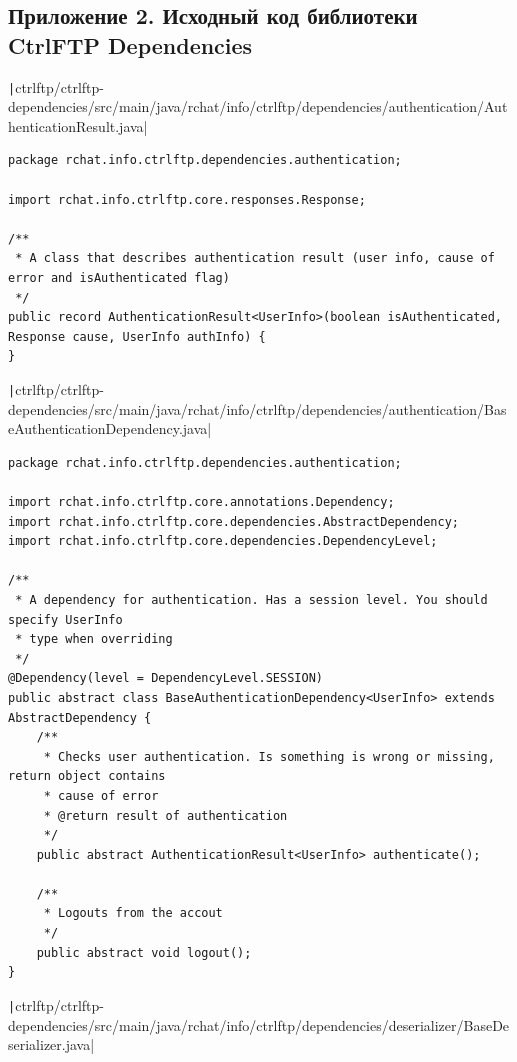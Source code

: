 \documentclass[a4paper,14pt]{extarticle}
\begin{document}
\subsection{Приложение 2. Исходный код библиотеки CtrlFTP Dependencies}
\texttt|ctrlftp/ctrlftp-dependencies/src/main/java/rchat/info/ctrlftp/dependencies/authentication/AuthenticationResult.java|
\begin{verbatim}
package rchat.info.ctrlftp.dependencies.authentication;

import rchat.info.ctrlftp.core.responses.Response;

/**
 * A class that describes authentication result (user info, cause of error and isAuthenticated flag)
 */
public record AuthenticationResult<UserInfo>(boolean isAuthenticated, Response cause, UserInfo authInfo) {
}
\end{verbatim}
\texttt|ctrlftp/ctrlftp-dependencies/src/main/java/rchat/info/ctrlftp/dependencies/authentication/BaseAuthenticationDependency.java|
\begin{verbatim}
package rchat.info.ctrlftp.dependencies.authentication;

import rchat.info.ctrlftp.core.annotations.Dependency;
import rchat.info.ctrlftp.core.dependencies.AbstractDependency;
import rchat.info.ctrlftp.core.dependencies.DependencyLevel;

/**
 * A dependency for authentication. Has a session level. You should specify UserInfo
 * type when overriding
 */
@Dependency(level = DependencyLevel.SESSION)
public abstract class BaseAuthenticationDependency<UserInfo> extends AbstractDependency {
    /**
     * Checks user authentication. Is something is wrong or missing, return object contains
     * cause of error
     * @return result of authentication
     */
    public abstract AuthenticationResult<UserInfo> authenticate();

    /**
     * Logouts from the accout
     */
    public abstract void logout();
}
\end{verbatim}
\texttt|ctrlftp/ctrlftp-dependencies/src/main/java/rchat/info/ctrlftp/dependencies/deserializer/BaseDeserializer.java|
\end{document}
